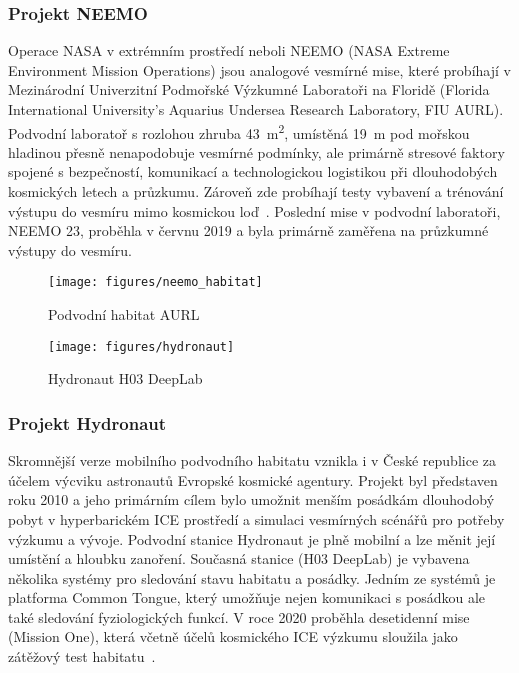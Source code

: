 \subsubsection*{Projekt NEEMO}
Operace \gls{NASA} v extrémním prostředí neboli \gls{NEEMO} (NASA Extreme
Environment Mission Operations) jsou analogové vesmírné mise, které probíhají v
Mezinárodní Univerzitní Podmořské Výzkumné Laboratoři na Floridě (Florida
International University's Aquarius Undersea Research Laboratory, \gls{FIU}
\gls{AURL}). Podvodní laboratoř s rozlohou zhruba \SI{43}{\metre\squared},
umístěná \SI{19}{\metre} pod mořskou hladinou přesně nenapodobuje vesmírné
podmínky, ale primárně stresové faktory spojené s bezpečností, komunikací a
technologickou logistikou při dlouhodobých kosmických letech a průzkumu. Zároveň
zde probíhají testy vybavení a trénování výstupu do vesmíru mimo kosmickou
loď~\cite{trembanis2012neemo,koutnik2021neemo}. Poslední mise v podvodní
laboratoři, \gls{NEEMO} 23, proběhla v červnu 2019 a byla primárně zaměřena na
průzkumné výstupy do vesmíru.

\begin{figure}[!htb]
    \centering
    \begin{minipage}[b]{.48\linewidth}
        \texttt{[image: figures/neemo\_habitat]}
        \caption{Podvodní habitat AURL~\cite{NASAneemo}}
    \end{minipage}
    \hfill
    \begin{minipage}[b]{.48\linewidth}
        \texttt{[image: figures/hydronaut]}
        \caption{Hydronaut H03 DeepLab~\cite{ESAhydronaut}}
    \end{minipage}
\end{figure}

\subsubsection*{Projekt Hydronaut}
Skromnější verze mobilního podvodního habitatu vznikla i v České republice za
účelem výcviku astronautů Evropské kosmické agentury. Projekt byl představen
roku 2010 a jeho primárním cílem bylo umožnit menším posádkám dlouhodobý pobyt
v hyperbarickém \gls{ICE} prostředí a simulaci vesmírných scénářů pro potřeby
výzkumu a vývoje. Podvodní stanice Hydronaut je plně mobilní a lze měnit její
umístění a hloubku zanoření. Současná stanice (H03 DeepLab) je vybavena několika
systémy pro sledování stavu habitatu a posádky. Jedním ze systémů je platforma
Common Tongue, který umožňuje nejen komunikaci s posádkou ale také sledování
fyziologických funkcí. V roce 2020 proběhla desetidenní mise (Mission One),
která včetně účelů kosmického \gls{ICE} výzkumu sloužila jako zátěžový test
habitatu~\cite{hydronaut2014}.


